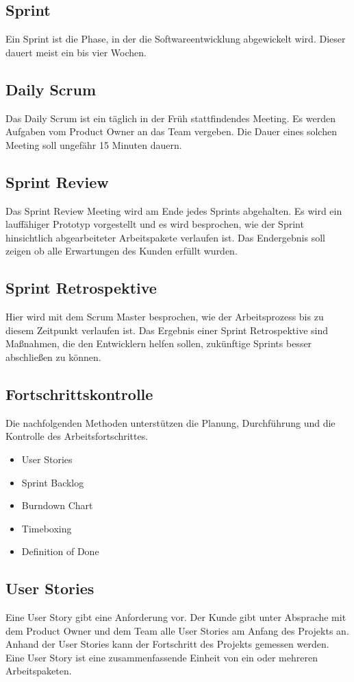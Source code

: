 \subsection{Sprint}
Ein Sprint ist die Phase, in der die Softwareentwicklung abgewickelt wird. Dieser dauert meist ein bis vier Wochen. 
\subsection{Daily Scrum}
Das Daily Scrum ist ein täglich in der Früh stattfindendes Meeting. Es werden Aufgaben vom Product Owner an das Team vergeben. Die Dauer eines solchen Meeting soll ungefähr 15 Minuten dauern.
\subsection{Sprint Review}
Das Sprint Review Meeting wird am Ende jedes Sprints abgehalten. Es wird ein lauffähiger Prototyp vorgestellt und es wird besprochen, wie der Sprint hinsichtlich abgearbeiteter Arbeitspakete verlaufen ist. Das Endergebnis soll zeigen ob alle Erwartungen des Kunden erfüllt wurden.
\subsection{Sprint Retrospektive}
Hier wird mit dem Scrum Master besprochen, wie der Arbeitsprozess bis zu diesem Zeitpunkt verlaufen ist. Das Ergebnis einer Sprint Retrospektive sind Maßnahmen, die den Entwicklern helfen sollen, zukünftige Sprints besser abschließen zu können.
\subsection{Fortschrittskontrolle}
Die nachfolgenden Methoden unterstützen die Planung, Durchführung und die Kontrolle des Arbeitsfortschrittes.
\begin{itemize}
	\item	User Stories
	\item	Sprint Backlog
	\item	Burndown Chart
	\item	Timeboxing
	\item	Definition of Done
\end{itemize}
\subsection{User Stories}
Eine User Story gibt eine Anforderung vor. Der Kunde gibt unter Absprache mit dem Product Owner und dem Team alle User Stories am Anfang des Projekts an.
Anhand der User Stories kann der Fortschritt des Projekts gemessen werden.
Eine User Story ist eine zusammenfassende Einheit von ein oder mehreren Arbeitspaketen.
